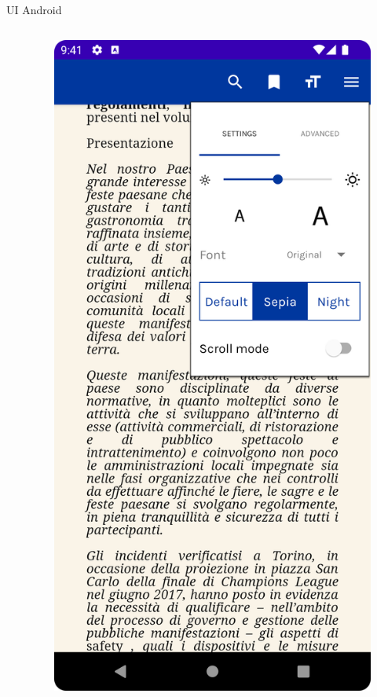\begin{frame}{UI Android}
\begin{columns}[onlytextwidth]
\begin{column}{0.24\textwidth}
        \end{column}
        \begin{column}{0.24\textwidth}
        
            \begin{figure}[H]
                \includegraphics[width=1\textwidth]{img/reader_settings.png}
            \end{figure}
            
        \end{column}
    \end{columns}
\end{frame}

